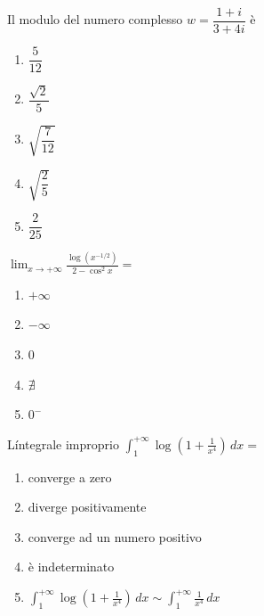 \begin{quiz}
Il modulo del numero complesso $w=\dfrac{1+i}{3+4i}$ \`e
\begin{enumerate}
\item $\dfrac5{12}$
\item $\dfrac{\sqrt2}{5}$
\item $\sqrt{\dfrac7{12}}$
\item $\sqrt{\dfrac25}$
\item $\dfrac2{25}$
\end{enumerate}
\end{quiz}

\begin{quiz}
$\displaystyle\lim_{x\to+\infty}\frac{\log(x^{-1/2})}{2-\cos^2x}=$
\begin{enumerate}
\item $+\infty$
\item $-\infty$
\item $0$
\item $\nexists$
\item $0^-$
\end{enumerate}
\end{quiz}

\begin{quiz}
L\'integrale improprio $\displaystyle\int_1^{+\infty}\log\left(1+\frac1{x^4}\right)\,dx=$
\begin{enumerate}
\item converge a zero
\item diverge positivamente
\item converge ad un numero positivo
\item \`e indeterminato
\item $\displaystyle\int_1^{+\infty}\log\left(1+\frac1{x^4}\right)\,dx\sim\int_1^{+\infty}\frac1{x^4}\,dx$
\end{enumerate}
\end{quiz}

